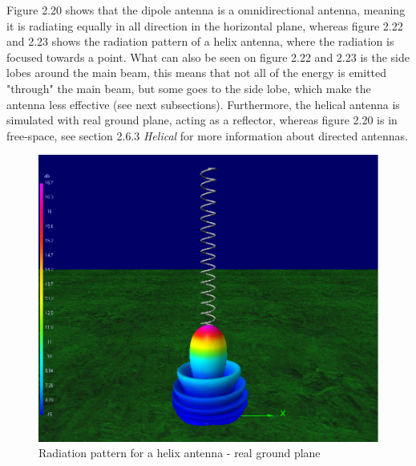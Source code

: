 Figure 2.20 shows that the dipole antenna is a omnidirectional antenna, meaning it is radiating equally in all direction in the horizontal plane, whereas figure 2.22 and 2.23 shows the radiation pattern of a helix antenna, where the radiation is focused towards a point. What can also be seen on figure 2.22 and 2.23 is the side lobes around the main beam, this means that not all of the energy is emitted "through" the main beam, but some goes to the side lobe, which make the antenna less effective (see next subsections). Furthermore, the helical antenna is simulated with real ground plane, acting as a reflector, whereas figure 2.20 is in free-space, see section 2.6.3 \textit{Helical} for more information about directed antennas. 

\begin{figure}[h]
\centering
\includegraphics[scale=0.45]{figures/HelixRad.PNG}
\caption{Radiation pattern for a helix antenna - real ground plane }
\end{figure}

